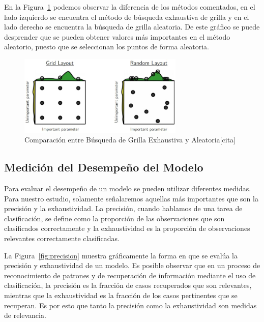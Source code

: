 En la Figura~\ref{fig:gridsearch} podemos observar la diferencia de los métodos comentados, en el lado izquierdo se encuentra el método de búsqueda exhaustiva de grilla y en el lado derecho se encuentra la búsqueda de grilla aleatoria. De este gráfico se puede desprender que se pueden obtener valores más importantes en el método aleatorio, puesto que se seleccionan los puntos de forma aleatoria.
       \begin{figure}[]
        \centering
        \includegraphics[width=0.7\textwidth]{Figuras/gridsearchbad.jpg}
         \caption{Comparación entre Búsqueda de Grilla Exhaustiva y Aleatoria[cita]}
         \label{fig:gridsearch}
      \end{figure}
\subsection{Medición del Desempeño del Modelo}

Para evaluar el desempeño de un modelo se pueden utilizar diferentes medidas. Para nuestro estudio, solamente señalaremos aquellas más importantes que son la precisión y la exhaustividad. La precisión, cuando hablamos de una tarea de clasificación, se define como la proporción de las observaciones que son clasificados correctamente y la exhaustividad es la proporción de observaciones relevantes correctamente clasificadas.

La Figura~\ref{fig:precision} muestra gráficamente la forma en que se evalúa la precisión y exhaustividad de un modelo. Es posible observar que en un proceso de reconocimiento de patrones y de recuperación de información mediante el uso de  clasificación, la precisión es la fracción de casos recuperados que son relevantes, mientras que la exhaustividad es la fracción de los casos pertinentes que se recuperan. Es por esto que tanto la precisión como la exhaustividad son medidas de relevancia.

